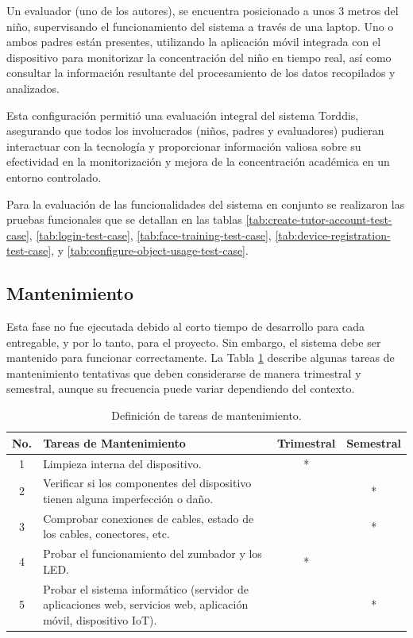 \documentclass[a4paper,fleqn]{cas-sc}
\begin{document}
			Un evaluador (uno de los autores), se encuentra posicionado a unos 3 metros del niño, supervisando el funcionamiento del sistema a través de una laptop. Uno o ambos padres están presentes, utilizando la aplicación móvil integrada con el dispositivo para monitorizar la concentración del niño en tiempo real, así como consultar la información resultante del procesamiento de los datos recopilados y analizados.
			
			Esta configuración permitió una evaluación integral del sistema Torddis, asegurando que todos los involucrados (niños, padres y evaluadores) pudieran interactuar con la tecnología y proporcionar información valiosa sobre su efectividad en la monitorización y mejora de la concentración académica en un entorno controlado.
			
			Para la evaluación de las funcionalidades del sistema en conjunto se realizaron las pruebas funcionales que se detallan en las tablas \ref{tab:create-tutor-account-test-case}, \ref{tab:login-test-case}, \ref{tab:face-training-test-case}, \ref{tab:device-registration-test-case}, y \ref{tab:configure-object-usage-test-case}.
			
		\subsection{Mantenimiento}
			Esta fase no fue ejecutada debido al corto tiempo de desarrollo para cada entregable, y por lo tanto, para el proyecto. Sin embargo, el sistema debe ser mantenido para funcionar correctamente. La Tabla \ref{tab:maintenance-tasks} describe algunas tareas de mantenimiento tentativas que deben considerarse de manera trimestral y semestral, aunque su frecuencia puede variar dependiendo del contexto.
		
			\begin{table}[h]
				\centering
				\caption{Definición de tareas de mantenimiento.}
				\label{tab:maintenance-tasks}
				\begin{tabularx}{\textwidth}{cXcc}
					\toprule
					\textbf{No.} & \textbf{Tareas de Mantenimiento} & \textbf{Trimestral} & \textbf{Semestral} \\
					\midrule
					1 & Limpieza interna del dispositivo. & * & \\
					2 & Verificar si los componentes del dispositivo tienen alguna imperfección o daño. & & * \\
					3 & Comprobar conexiones de cables, estado de los cables, conectores, etc. & & * \\
					4 & Probar el funcionamiento del zumbador y los LED. & * & \\
					5 & Probar el sistema informático (servidor de aplicaciones web, servicios web, aplicación móvil, dispositivo IoT). & & * \\
					\bottomrule
				\end{tabularx}
			\end{table}
						
\end{document}
